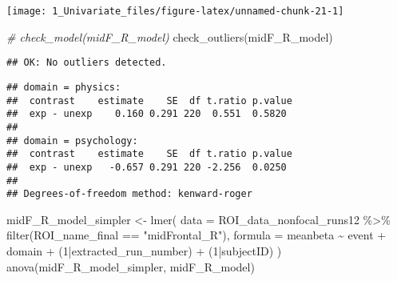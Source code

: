 \documentclass[
]{article}
\newenvironment{Shaded}{\begin{snugshade}}{\end{snugshade}}
\newcommand{\AttributeTok}[1]{\textcolor[rgb]{0.77,0.63,0.00}{#1}}
\newcommand{\CommentTok}[1]{\textcolor[rgb]{0.56,0.35,0.01}{\textit{#1}}}
\newcommand{\DecValTok}[1]{\textcolor[rgb]{0.00,0.00,0.81}{#1}}
\newcommand{\FunctionTok}[1]{\textcolor[rgb]{0.00,0.00,0.00}{#1}}
\newcommand{\NormalTok}[1]{#1}
\newcommand{\OtherTok}[1]{\textcolor[rgb]{0.56,0.35,0.01}{#1}}
\newcommand{\SpecialCharTok}[1]{\textcolor[rgb]{0.00,0.00,0.00}{#1}}
\newcommand{\StringTok}[1]{\textcolor[rgb]{0.31,0.60,0.02}{#1}}
\begin{document}
\texttt{[image: 1\_Univariate\_files/figure-latex/unnamed-chunk-21-1]}

\begin{Shaded}
\begin{Highlighting}[]
\CommentTok{\# check\_model(midF\_R\_model)}
\FunctionTok{check\_outliers}\NormalTok{(midF\_R\_model)}
\end{Highlighting}
\end{Shaded}

\begin{verbatim}
## OK: No outliers detected.
\end{verbatim}

\begin{Shaded}
\end{Shaded}

\begin{verbatim}
## domain = physics:
##  contrast    estimate    SE  df t.ratio p.value
##  exp - unexp    0.160 0.291 220  0.551  0.5820 
## 
## domain = psychology:
##  contrast    estimate    SE  df t.ratio p.value
##  exp - unexp   -0.657 0.291 220 -2.256  0.0250 
## 
## Degrees-of-freedom method: kenward-roger
\end{verbatim}

\begin{Shaded}
\begin{Highlighting}[]
\NormalTok{midF\_R\_model\_simpler }\OtherTok{\textless{}{-}} \FunctionTok{lmer}\NormalTok{(}
      \AttributeTok{data =}\NormalTok{ ROI\_data\_nonfocal\_runs12 }\SpecialCharTok{\%\textgreater{}\%}
        \FunctionTok{filter}\NormalTok{(ROI\_name\_final }\SpecialCharTok{==} \StringTok{"midFrontal\_R"}\NormalTok{),}
      \AttributeTok{formula =}\NormalTok{ meanbeta }\SpecialCharTok{\textasciitilde{}}\NormalTok{ event }\SpecialCharTok{+}\NormalTok{ domain }\SpecialCharTok{+}\NormalTok{ (}\DecValTok{1}\SpecialCharTok{|}\NormalTok{extracted\_run\_number) }\SpecialCharTok{+}\NormalTok{ (}\DecValTok{1}\SpecialCharTok{|}\NormalTok{subjectID)}
\NormalTok{    )}
\FunctionTok{anova}\NormalTok{(midF\_R\_model\_simpler, midF\_R\_model)}
\end{Highlighting}
\end{Shaded}
\end{document}
